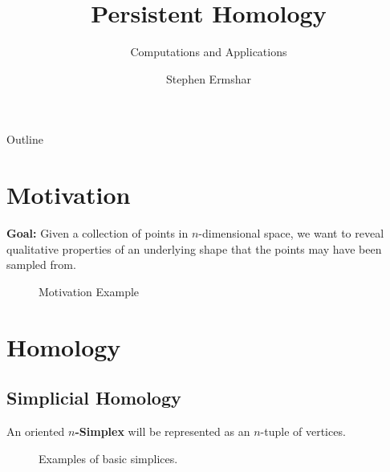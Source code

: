 

\title{Persistent Homology}
\subtitle{Computations and Applications}
\author{Stephen Ermshar}
\date{}






\begin{frame}
    \titlepage
\end{frame}

\begin{frame}{Outline}
	\tableofcontents
\end{frame}

\section[Motivation]{Motivation}
\begin{frame}
	\textbf{Goal:} Given a collection of points in \(n\)-dimensional space, we want to reveal qualitative properties of an underlying shape that the points may have been sampled from.

	\begin{figure}
		
		\caption{Motivation Example}
	\end{figure}
\end{frame}

\section[Homology]{Homology}
\subsection{Simplicial Homology}
\begin{frame}
	\begin{definition}
		An oriented \textbf{\(n\)-Simplex} will be represented as an \(n\)-tuple of vertices.
	\end{definition}
	\begin{figure}
		
		\caption{Examples of basic simplices.}
	\end{figure}
\end{frame}

